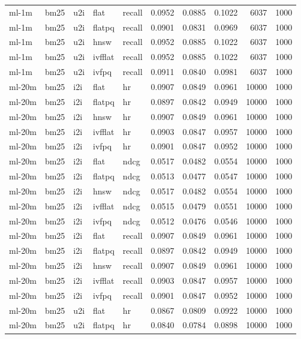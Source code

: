 \begin{tabular}{lllllrrrrr}
ml-1m & bm25 & u2i & flat & recall & 0.0952 & 0.0885 & 0.1022 & 6037 & 1000 \\
ml-1m & bm25 & u2i & flatpq & recall & 0.0901 & 0.0831 & 0.0969 & 6037 & 1000 \\
ml-1m & bm25 & u2i & hnsw & recall & 0.0952 & 0.0885 & 0.1022 & 6037 & 1000 \\
ml-1m & bm25 & u2i & ivfflat & recall & 0.0952 & 0.0885 & 0.1022 & 6037 & 1000 \\
ml-1m & bm25 & u2i & ivfpq & recall & 0.0911 & 0.0840 & 0.0981 & 6037 & 1000 \\
ml-20m & bm25 & i2i & flat & hr & 0.0907 & 0.0849 & 0.0961 & 10000 & 1000 \\
ml-20m & bm25 & i2i & flatpq & hr & 0.0897 & 0.0842 & 0.0949 & 10000 & 1000 \\
ml-20m & bm25 & i2i & hnsw & hr & 0.0907 & 0.0849 & 0.0961 & 10000 & 1000 \\
ml-20m & bm25 & i2i & ivfflat & hr & 0.0903 & 0.0847 & 0.0957 & 10000 & 1000 \\
ml-20m & bm25 & i2i & ivfpq & hr & 0.0901 & 0.0847 & 0.0952 & 10000 & 1000 \\
ml-20m & bm25 & i2i & flat & ndcg & 0.0517 & 0.0482 & 0.0554 & 10000 & 1000 \\
ml-20m & bm25 & i2i & flatpq & ndcg & 0.0513 & 0.0477 & 0.0547 & 10000 & 1000 \\
ml-20m & bm25 & i2i & hnsw & ndcg & 0.0517 & 0.0482 & 0.0554 & 10000 & 1000 \\
ml-20m & bm25 & i2i & ivfflat & ndcg & 0.0515 & 0.0479 & 0.0551 & 10000 & 1000 \\
ml-20m & bm25 & i2i & ivfpq & ndcg & 0.0512 & 0.0476 & 0.0546 & 10000 & 1000 \\
ml-20m & bm25 & i2i & flat & recall & 0.0907 & 0.0849 & 0.0961 & 10000 & 1000 \\
ml-20m & bm25 & i2i & flatpq & recall & 0.0897 & 0.0842 & 0.0949 & 10000 & 1000 \\
ml-20m & bm25 & i2i & hnsw & recall & 0.0907 & 0.0849 & 0.0961 & 10000 & 1000 \\
ml-20m & bm25 & i2i & ivfflat & recall & 0.0903 & 0.0847 & 0.0957 & 10000 & 1000 \\
ml-20m & bm25 & i2i & ivfpq & recall & 0.0901 & 0.0847 & 0.0952 & 10000 & 1000 \\
ml-20m & bm25 & u2i & flat & hr & 0.0867 & 0.0809 & 0.0922 & 10000 & 1000 \\
ml-20m & bm25 & u2i & flatpq & hr & 0.0840 & 0.0784 & 0.0898 & 10000 & 1000 \\

\end{tabular}

